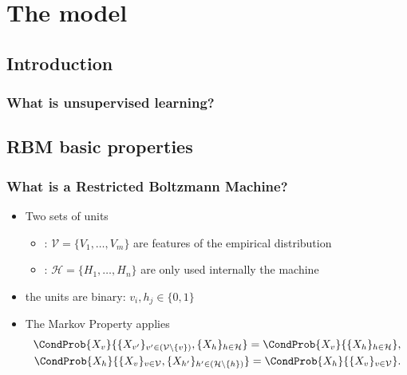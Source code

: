 \section{The model}
\subsection{Introduction}

\begin{frame}
  \frametitle{What is unsupervised learning?}
  
\end{frame}

\subsection{RBM basic properties}
\begin{frame}
  \frametitle{What is a Restricted Boltzmann Machine?}
  \begin{itemize}
    \item Two sets of \alert{units}
      \begin{itemize}
        \item {}: \(\mathcal{V} = \{V_1, \dots, V_m\}\) are features of the empirical distribution
        \item {}: \(\mathcal{H} = \{H_1, \dots, H_n\}\) are only used internally the machine
      \end{itemize}
    \item the units are \alert{binary}: \(v_i, h_j \in \{0,1\}\)
    \item The \alert{Markov Property} applies
      \begin{align*}
        \CondProb{X_v}{\{X_{v'}\}_{v'\in (\mathcal{V} \setminus \{v\})}, \{X_h\}_{h\in \mathcal{H}}} =
        \CondProb{X_v}{\{X_h\}_{h\in \mathcal{H}}}, \\
        \CondProb{X_h}{\{X_v\}_{v\in \mathcal{V}}, \{X_{h'}\}_{h'\in (\mathcal{H} \setminus \{h\})}} =
        \CondProb{X_h}{\{X_v\}_{v\in \mathcal{V}}}.
      \end{align*}
      \begin{figure}
        \resizebox{0.6\textwidth}{!}{}
      \end{figure}
    
  \end{itemize}
\end{frame}

